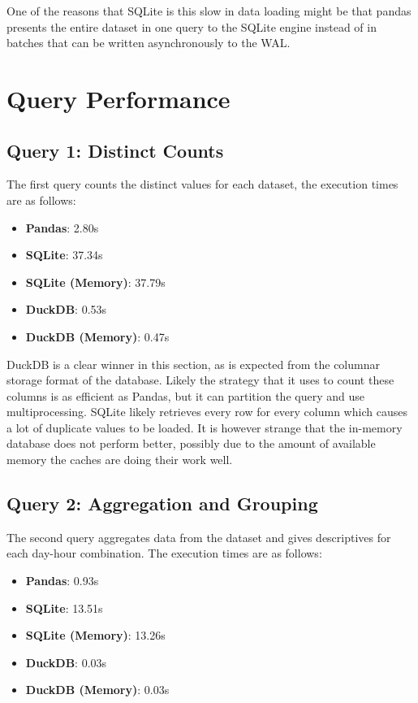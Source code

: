 \documentclass[a4paper,10pt]{article}
\begin{document}
One of the reasons that SQLite is this slow in data loading might be that pandas
presents the entire dataset in one query to the SQLite engine instead of in batches
that can be written asynchronously to the WAL.

\section{Query Performance}
\subsection{Query 1: Distinct Counts}

The first query counts the distinct values for each dataset, the execution times
are as follows:

\begin{itemize}
  \item \textbf{Pandas}: 2.80s
  \item \textbf{SQLite}: 37.34s
  \item \textbf{SQLite (Memory)}: 37.79s
  \item \textbf{DuckDB}: 0.53s
  \item \textbf{DuckDB (Memory)}: 0.47s
\end{itemize}

DuckDB is a clear winner in this section, as is expected from the columnar storage
format of the database. Likely the strategy that it uses to count these columns is
as efficient as Pandas, but it can partition the query and use multiprocessing. SQLite
likely retrieves every row for every column which causes a lot of duplicate values to
be loaded. It is however strange that the in-memory database does not perform better,
possibly due to the amount of available memory the caches are doing their work well.

\subsection{Query 2: Aggregation and Grouping}

The second query aggregates data from the dataset and gives descriptives for each
day-hour combination. The execution times are as follows:

\begin{itemize}
  \item \textbf{Pandas}: 0.93s
  \item \textbf{SQLite}: 13.51s
  \item \textbf{SQLite (Memory)}: 13.26s
  \item \textbf{DuckDB}: 0.03s
  \item \textbf{DuckDB (Memory)}: 0.03s
\end{itemize}
\end{document}
